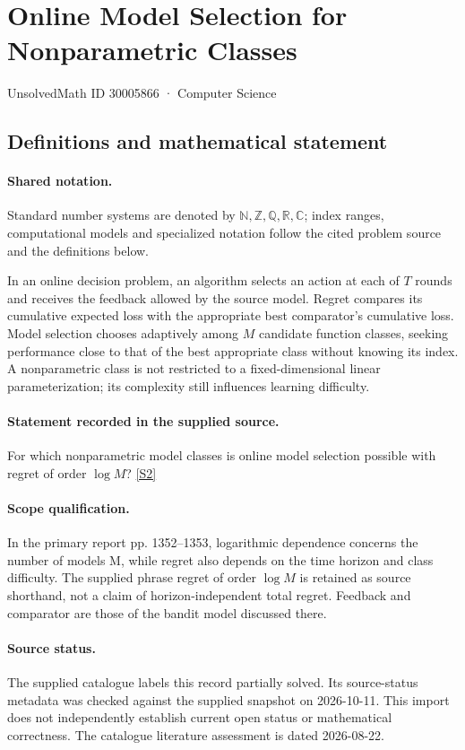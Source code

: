 \documentclass[11pt]{article}
\newcommand{\sref}[2]{\hyperlink{source:#1:#2}{[S#2]}}
\begin{document}
\setcounter{section}{30005865}
\section{Online Model Selection for Nonparametric Classes}\label{30005866}
{\small\sffamily UnsolvedMath ID 30005866 · Computer Science}
\subsection{Definitions and mathematical statement}

\paragraph{Shared notation.}Standard number systems are denoted by $\mathbb N,\mathbb Z,\mathbb Q,\mathbb R,\mathbb C$; index ranges, computational models and specialized notation follow the cited problem source and the definitions below.


In an online decision problem, an algorithm selects an action at each of $T$ rounds and receives the feedback allowed by the source model. Regret compares its cumulative expected loss with the appropriate best comparator's cumulative loss. Model selection chooses adaptively among $M$ candidate function classes, seeking performance close to that of the best appropriate class without knowing its index. A nonparametric class is not restricted to a fixed-dimensional linear parameterization; its complexity still influences learning difficulty.
\paragraph{Statement recorded in the supplied source.}
For which nonparametric model classes is online model selection possible with regret of order $\log M$? \sref{30005866}{2}
\paragraph{Scope qualification.}
In the primary report pp. 1352--1353, logarithmic dependence concerns the number of models M, while regret also depends on the time horizon and class difficulty. The supplied phrase regret of order $\log M$ is retained as source shorthand, not a claim of horizon-independent total regret. Feedback and comparator are those of the bandit model discussed there.
\paragraph{Source status.}
The supplied catalogue labels this record partially solved. Its source-status metadata was checked against the supplied snapshot on 2026-10-11. This import does not independently establish current open status or mathematical correctness. The catalogue literature assessment is dated 2026-08-22.
\end{document}
